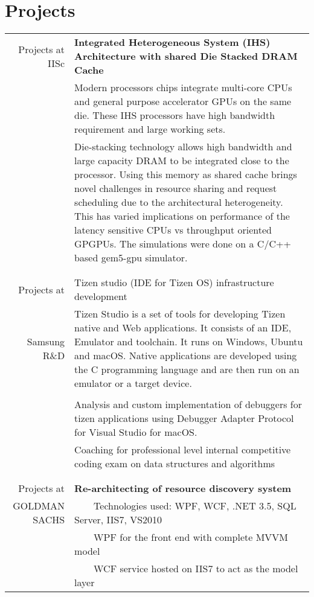 \documentclass[a4paper,10pt]{article} %
\newcommand{\tabitem}{~~\llap{\textbullet}~~}
\begin{document}
\section{Projects}
\begin{tabular}{rp{13cm}}
Projects at IISc& \textbf{Integrated Heterogeneous System (IHS) Architecture with shared Die Stacked DRAM Cache} \\
& \setlength{\leftskip}{0.4cm}
Modern processors chips integrate multi-core CPUs and general purpose accelerator GPUs on the same die. These IHS processors have high bandwidth requirement and large working sets.\\
& \setlength{\leftskip}{0.4cm} 
Die-stacking technology allows high bandwidth and large capacity DRAM to be
integrated close to the processor. Using this memory as shared cache brings
novel challenges in resource sharing and request scheduling due to the
architectural heterogeneity. This has varied implications on performance of the
latency sensitive CPUs vs throughput oriented GPGPUs. The simulations were done
on a C/C++ based gem5-gpu simulator.\\
&\\
&\\
Projects at  &  Tizen studio (IDE for Tizen OS) infrastructure development \\
Samsung R\&D & Tizen Studio is a set of tools for developing Tizen native and Web applications. It consists of an IDE, Emulator and toolchain. It runs on Windows, Ubuntu and macOS. Native applications are developed using the C programming language and are then run on an emulator or a target device. \\
&\\
& Analysis and custom implementation of debuggers for tizen applications using Debugger Adapter Protocol for Visual Studio for macOS.  
\\
& Coaching for professional level internal competitive coding exam on data 
structures and algorithms \\
&\\
&\\
Projects at  &  \textbf{Re-architecting of resource discovery system} \\
GOLDMAN SACHS &  \tabitem Technologies used: WPF, WCF, .NET 3.5, SQL Server, IIS7, VS2010 \\
& \tabitem WPF for the front end with complete MVVM model\\
& \tabitem WCF service hosted on IIS7 to act as the model layer\\

\end{tabular}
\end{document}
